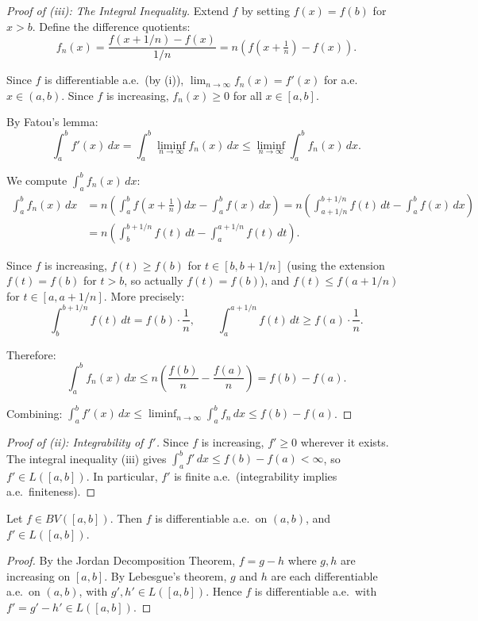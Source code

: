 \documentclass[11pt]{report}
\begin{document}
\begin{proof}[Proof of (iii): The Integral Inequality]
Extend $f$ by setting $f(x) = f(b)$ for $x > b$. Define the difference quotients:
\[
f_n(x) = \frac{f(x + 1/n) - f(x)}{1/n} = n\!\left(f\!\left(x + \tfrac{1}{n}\right) - f(x)\right).
\]

Since $f$ is differentiable a.e.\ (by (i)), $\lim_{n \to \infty} f_n(x) = f'(x)$ for a.e.\ $x \in (a, b)$. Since $f$ is increasing, $f_n(x) \geq 0$ for all $x \in [a, b]$.

By Fatou's lemma:
\[
\int_a^b f'(x)\,dx = \int_a^b \liminf_{n \to \infty} f_n(x)\,dx \leq \liminf_{n \to \infty} \int_a^b f_n(x)\,dx.
\]

We compute $\int_a^b f_n(x)\,dx$:
\begin{align*}
\int_a^b f_n(x)\,dx &= n\!\left(\int_a^b f\!\left(x + \tfrac{1}{n}\right)\!dx - \int_a^b f(x)\,dx\right) = n\!\left(\int_{a+1/n}^{b+1/n} f(t)\,dt - \int_a^b f(x)\,dx\right) \\
&= n\!\left(\int_b^{b+1/n} f(t)\,dt - \int_a^{a+1/n} f(t)\,dt\right).
\end{align*}

Since $f$ is increasing, $f(t) \geq f(b)$ for $t \in [b, b+1/n]$ (using the extension $f(t) = f(b)$ for $t > b$, so actually $f(t) = f(b)$), and $f(t) \leq f(a + 1/n)$ for $t \in [a, a+1/n]$. More precisely:
\[
\int_b^{b+1/n} f(t)\,dt = f(b) \cdot \frac{1}{n}, \qquad \int_a^{a+1/n} f(t)\,dt \geq f(a) \cdot \frac{1}{n}.
\]

Therefore:
\[
\int_a^b f_n(x)\,dx \leq n\!\left(\frac{f(b)}{n} - \frac{f(a)}{n}\right) = f(b) - f(a).
\]

Combining: $\int_a^b f'(x)\,dx \leq \liminf_{n \to \infty} \int_a^b f_n\,dx \leq f(b) - f(a)$.
\end{proof}

\begin{proof}[Proof of (ii): Integrability of $f'$]
Since $f$ is increasing, $f' \geq 0$ wherever it exists. The integral inequality (iii) gives $\int_a^b f'\,dx \leq f(b) - f(a) < \infty$, so $f' \in L([a, b])$. In particular, $f'$ is finite a.e.\ (integrability implies a.e.\ finiteness).
\end{proof}

\begin{corbox}
Let $f \in BV([a, b])$. Then $f$ is differentiable a.e.\ on $(a, b)$, and $f' \in L([a, b])$.
\end{corbox}

\begin{proof}
By the Jordan Decomposition Theorem, $f = g - h$ where $g, h$ are increasing on $[a, b]$. By Lebesgue's theorem, $g$ and $h$ are each differentiable a.e.\ on $(a, b)$, with $g', h' \in L([a, b])$. Hence $f$ is differentiable a.e.\ with $f' = g' - h' \in L([a, b])$.
\end{proof}
\end{document}
